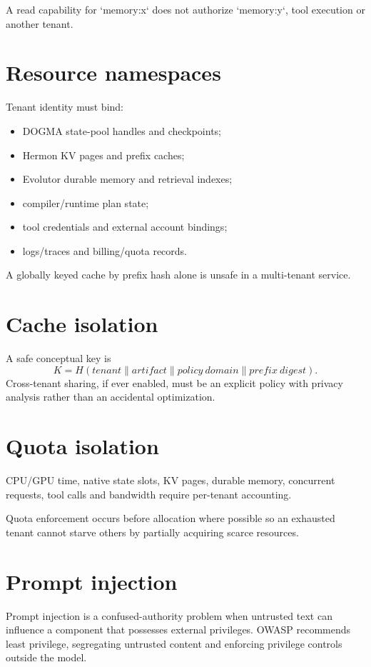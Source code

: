 A read capability for `memory:x` does not authorize `memory:y`, tool execution or another tenant.

\section{Resource namespaces}
Tenant identity must bind:
\begin{itemize}
\item DOGMA state-pool handles and checkpoints;
\item Hermon KV pages and prefix caches;
\item Evolutor durable memory and retrieval indexes;
\item compiler/runtime plan state;
\item tool credentials and external account bindings;
\item logs/traces and billing/quota records.
\end{itemize}

A globally keyed cache by prefix hash alone is unsafe in a multi-tenant service.

\section{Cache isolation}
A safe conceptual key is
\[
K=H(tenant\|artifact\|policy\ domain\|prefix\ digest).
\]
Cross-tenant sharing, if ever enabled, must be an explicit policy with privacy analysis rather than an accidental optimization.

\section{Quota isolation}
CPU/GPU time, native state slots, KV pages, durable memory, concurrent requests, tool calls and bandwidth require per-tenant accounting.

Quota enforcement occurs before allocation where possible so an exhausted tenant cannot starve others by partially acquiring scarce resources.

\section{Prompt injection}
Prompt injection is a confused-authority problem when untrusted text can influence a component that possesses external privileges. OWASP recommends least privilege, segregating untrusted content and enforcing privilege controls outside the model.

